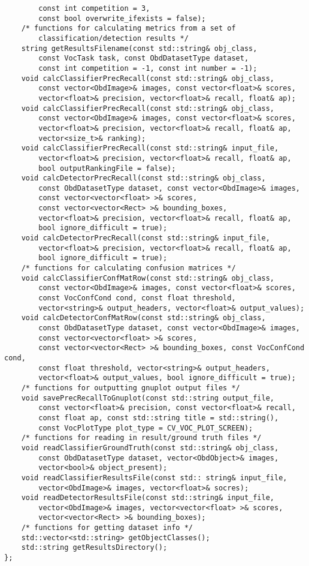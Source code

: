 \begin{lstlisting}
        const int competition = 3,
        const bool overwrite_ifexists = false);
    /* functions for calculating metrics from a set of
        classification/detection results */
    string getResultsFilename(const std::string& obj_class,
        const VocTask task, const ObdDatasetType dataset,
        const int competition = -1, const int number = -1);
    void calcClassifierPrecRecall(const std::string& obj_class,
        const vector<ObdImage>& images, const vector<float>& scores,
        vector<float>& precision, vector<float>& recall, float& ap);
    void calcClassifierPrecRecall(const std::string& obj_class,
        const vector<ObdImage>& images, const vector<float>& scores,
        vector<float>& precision, vector<float>& recall, float& ap,
        vector<size_t>& ranking);
    void calcClassifierPrecRecall(const std::string& input_file,
        vector<float>& precision, vector<float>& recall, float& ap,
        bool outputRankingFile = false);
    void calcDetectorPrecRecall(const std::string& obj_class,
        const ObdDatasetType dataset, const vector<ObdImage>& images,
        const vector<vector<float> >& scores,
        const vector<vector<Rect> >& bounding_boxes,
        vector<float>& precision, vector<float>& recall, float& ap,
        bool ignore_difficult = true);
    void calcDetectorPrecRecall(const std::string& input_file,
        vector<float>& precision, vector<float>& recall, float& ap,
        bool ignore_difficult = true);
    /* functions for calculating confusion matrices */
    void calcClassifierConfMatRow(const std::string& obj_class,
        const vector<ObdImage>& images, const vector<float>& scores,
        const VocConfCond cond, const float threshold,
        vector<string>& output_headers, vector<float>& output_values);
    void calcDetectorConfMatRow(const std::string& obj_class,
        const ObdDatasetType dataset, const vector<ObdImage>& images,
        const vector<vector<float> >& scores,
        const vector<vector<Rect> >& bounding_boxes, const VocConfCond cond,
        const float threshold, vector<string>& output_headers,
        vector<float>& output_values, bool ignore_difficult = true);
    /* functions for outputting gnuplot output files */
    void savePrecRecallToGnuplot(const std::string output_file,
        const vector<float>& precision, const vector<float>& recall,
        const float ap, const std::string title = std::string(),
        const VocPlotType plot_type = CV_VOC_PLOT_SCREEN);
    /* functions for reading in result/ground truth files */
    void readClassifierGroundTruth(const std::string& obj_class,
        const ObdDatasetType dataset, vector<ObdObject>& images,
        vector<bool>& object_present);
    void readClassifierResultsFile(const std:: string& input_file,
        vector<ObdImage>& images, vector<float>& socres);
    void readDetectorResultsFile(const std::string& input_file,
        vector<ObdImage>& images, vector<vector<float> >& scores,
        vector<vector<Rect> >& bounding_boxes);
    /* functions for getting dataset info */
    std::vector<std::string> getObjectClasses();
    std::string getResultsDirectory();
};
\end{lstlisting}
